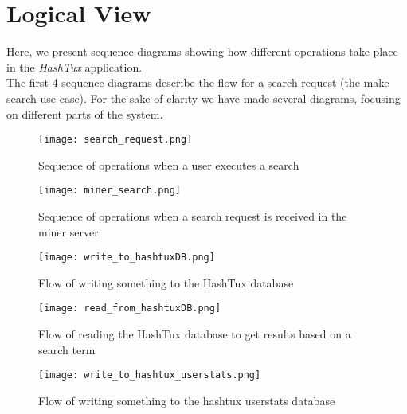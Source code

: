 \hypertarget{logicalview}{
\chapter{Logical View}}
Here, we present sequence diagrams showing how different operations take place
in the \textit{HashTux} application. \\

The first 4 sequence diagrams describe the flow for a search request (the make
search use case). For the sake of clarity we have made several diagrams,
focusing on different parts of the system.
\newpage
\begin{figure}[ht]
  \centering
  \texttt{[image: search\_request.png]}
  \caption{Sequence of operations when a user executes a search}
\end{figure}
\newpage
\begin{figure}[ht]
  \centering
  \texttt{[image: miner\_search.png]}
  \caption{Sequence of operations when a search request is received in the miner
     server}
\end{figure}
\newpage
\begin{figure}[ht]
  \centering
  \texttt{[image: write\_to\_hashtuxDB.png]}
  \caption{Flow of writing something to the HashTux database}
\end{figure}
\begin{figure}[ht]
  \centering
  \texttt{[image: read\_from\_hashtuxDB.png]}
  \caption{Flow of reading the HashTux database to get results based
     on a search term}
\end{figure}
\begin{figure}[ht]
  \centering
  \texttt{[image: write\_to\_hashtux\_userstats.png]}
  \caption{Flow of writing something to the hashtux\textunderscore
     userstats database}
\end{figure}